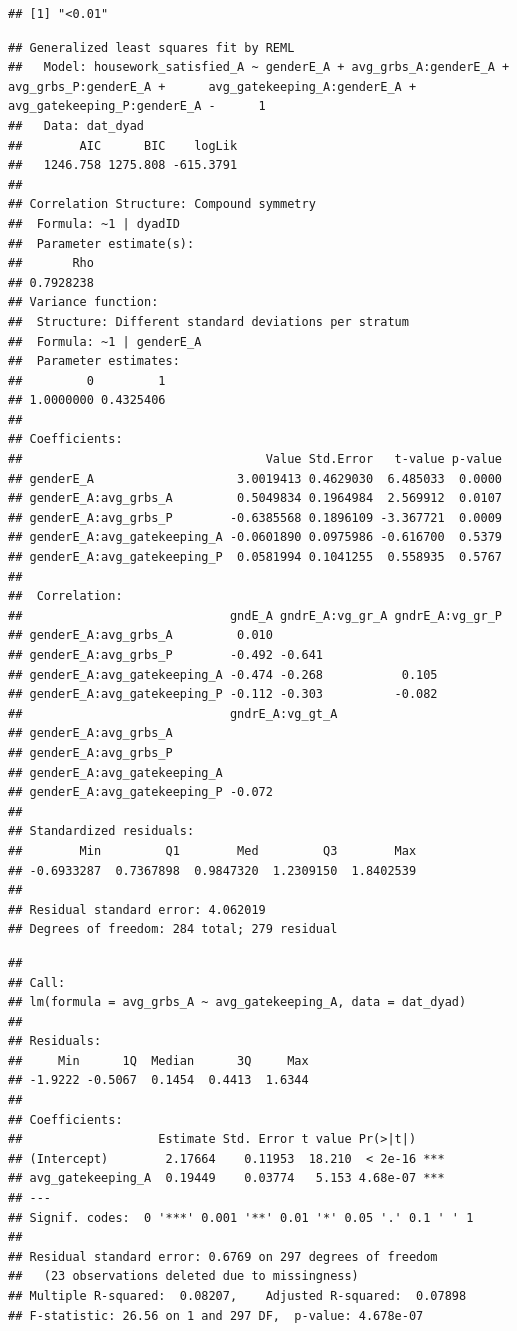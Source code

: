 \documentclass[
  man,floatsintext]{apa6}
\begin{document}
\begin{verbatim}
## [1] "<0.01"
\end{verbatim}

\begin{verbatim}
## Generalized least squares fit by REML
##   Model: housework_satisfied_A ~ genderE_A + avg_grbs_A:genderE_A + avg_grbs_P:genderE_A +      avg_gatekeeping_A:genderE_A + avg_gatekeeping_P:genderE_A -      1 
##   Data: dat_dyad 
##        AIC      BIC    logLik
##   1246.758 1275.808 -615.3791
## 
## Correlation Structure: Compound symmetry
##  Formula: ~1 | dyadID 
##  Parameter estimate(s):
##       Rho 
## 0.7928238 
## Variance function:
##  Structure: Different standard deviations per stratum
##  Formula: ~1 | genderE_A 
##  Parameter estimates:
##         0         1 
## 1.0000000 0.4325406 
## 
## Coefficients:
##                                  Value Std.Error   t-value p-value
## genderE_A                    3.0019413 0.4629030  6.485033  0.0000
## genderE_A:avg_grbs_A         0.5049834 0.1964984  2.569912  0.0107
## genderE_A:avg_grbs_P        -0.6385568 0.1896109 -3.367721  0.0009
## genderE_A:avg_gatekeeping_A -0.0601890 0.0975986 -0.616700  0.5379
## genderE_A:avg_gatekeeping_P  0.0581994 0.1041255  0.558935  0.5767
## 
##  Correlation: 
##                             gndE_A gndrE_A:vg_gr_A gndrE_A:vg_gr_P
## genderE_A:avg_grbs_A         0.010                                
## genderE_A:avg_grbs_P        -0.492 -0.641                         
## genderE_A:avg_gatekeeping_A -0.474 -0.268           0.105         
## genderE_A:avg_gatekeeping_P -0.112 -0.303          -0.082         
##                             gndrE_A:vg_gt_A
## genderE_A:avg_grbs_A                       
## genderE_A:avg_grbs_P                       
## genderE_A:avg_gatekeeping_A                
## genderE_A:avg_gatekeeping_P -0.072         
## 
## Standardized residuals:
##        Min         Q1        Med         Q3        Max 
## -0.6933287  0.7367898  0.9847320  1.2309150  1.8402539 
## 
## Residual standard error: 4.062019 
## Degrees of freedom: 284 total; 279 residual
\end{verbatim}

\begin{verbatim}
## 
## Call:
## lm(formula = avg_grbs_A ~ avg_gatekeeping_A, data = dat_dyad)
## 
## Residuals:
##     Min      1Q  Median      3Q     Max 
## -1.9222 -0.5067  0.1454  0.4413  1.6344 
## 
## Coefficients:
##                   Estimate Std. Error t value Pr(>|t|)    
## (Intercept)        2.17664    0.11953  18.210  < 2e-16 ***
## avg_gatekeeping_A  0.19449    0.03774   5.153 4.68e-07 ***
## ---
## Signif. codes:  0 '***' 0.001 '**' 0.01 '*' 0.05 '.' 0.1 ' ' 1
## 
## Residual standard error: 0.6769 on 297 degrees of freedom
##   (23 observations deleted due to missingness)
## Multiple R-squared:  0.08207,    Adjusted R-squared:  0.07898 
## F-statistic: 26.56 on 1 and 297 DF,  p-value: 4.678e-07
\end{verbatim}
\end{document}
